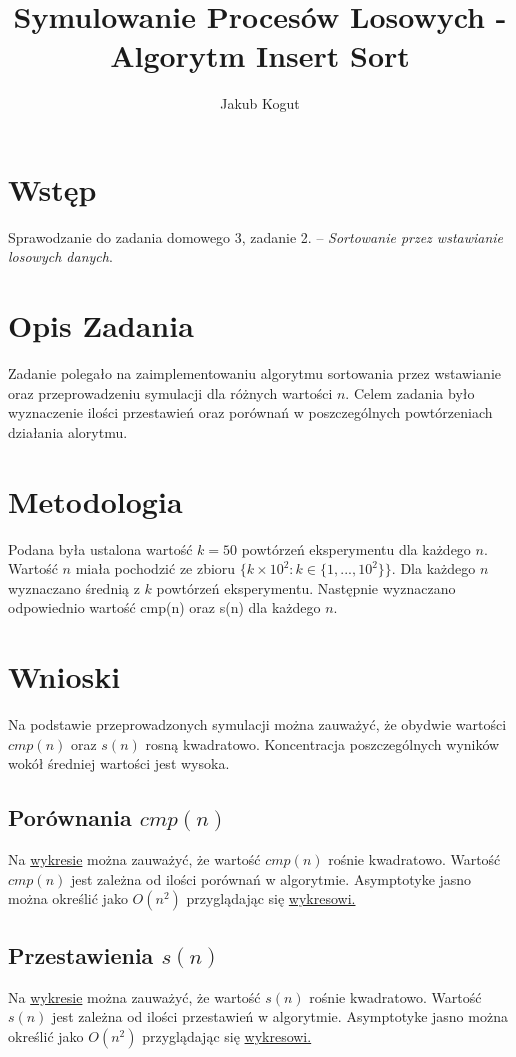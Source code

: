 \documentclass{article}
\title{Symulowanie Procesów Losowych - Algorytm Insert Sort}
\author{Jakub Kogut}
\date{}
\begin{document}
\maketitle

\section{Wstęp}
Sprawodzanie do zadania domowego 3, zadanie 2. -- \textit{Sortowanie przez wstawianie losowych danych}.
\section{Opis Zadania}
Zadanie polegało na zaimplementowaniu algorytmu sortowania przez wstawianie oraz przeprowadzeniu symulacji dla różnych wartości $n$. \newline
Celem zadania było wyznaczenie ilości przestawień oraz porównań w poszczególnych powtórzeniach działania alorytmu.
\section{Metodologia}
Podana była ustalona wartość $k=50$ powtórzeń eksperymentu dla każdego $n$. Wartość $n$ miała pochodzić ze zbioru $\{k \times 10^2: k \in \{1, ..., 10^2\}\}$. Dla każdego $n$ wyznaczano średnią z $k$ powtórzeń eksperymentu. Następnie wyznaczano odpowiednio wartość cmp(n) oraz s(n) dla każdego $n$.
\section{Wnioski}
Na podstawie przeprowadzonych symulacji można zauważyć, że obydwie wartości $cmp(n)$ oraz $s(n)$ rosną kwadratowo. Koncentracja poszczególnych wyników wokół średniej wartości jest wysoka.
\subsection{Porównania $cmp(n)$}
Na \hyperref[fig:cmp]{wykresie} można zauważyć, że wartość $cmp(n)$ rośnie kwadratowo. Wartość $cmp(n)$ jest zależna od ilości porównań w algorytmie. Asymptotyke jasno można określić jako $O(n^2)$ przyglądając się \hyperref[fig:cmpOvern2]{wykresowi.}
\subsection{Przestawienia $s(n)$}
Na \hyperref[fig:s]{wykresie} można zauważyć, że wartość $s(n)$ rośnie kwadratowo. Wartość $s(n)$ jest zależna od ilości przestawień w algorytmie. Asymptotyke jasno można określić jako $O(n^2)$ przyglądając się \hyperref[fig:Ln1]{wykresowi.}
\end{document}
